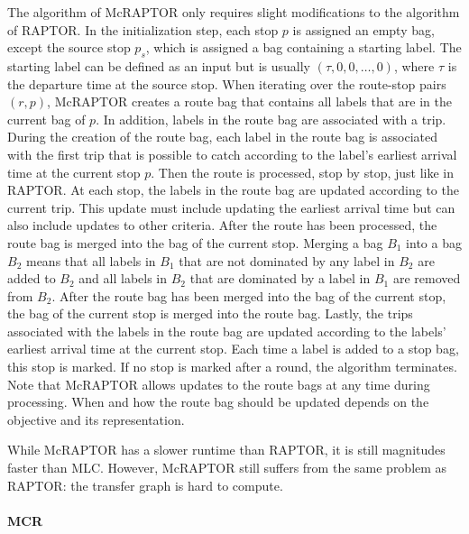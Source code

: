 The algorithm of McRAPTOR only requires slight modifications to the algorithm of RAPTOR.
In the initialization step, each stop \(p\) is assigned an empty bag, except the source stop \(p_s\), which is assigned a bag containing a starting label.
The starting label can be defined as an input but is usually \((\tau, 0, 0, \dots, 0)\), where \(\tau\) is the departure time at the source stop.
When iterating over the route-stop pairs \((r, p)\), McRAPTOR creates a route bag that contains all labels that are in the current bag of \(p\).
In addition, labels in the route bag are associated with a trip.
During the creation of the route bag, each label in the route bag is associated with the first trip that is possible to catch according to the label's earliest arrival time at the current stop \(p\).
Then the route is processed, stop by stop, just like in RAPTOR.
At each stop, the labels in the route bag are updated according to the current trip.
This update must include updating the earliest arrival time but can also include updates to other criteria.
After the route has been processed, the route bag is merged into the bag of the current stop.
Merging a bag \(B_1\) into a bag \(B_2\) means that all labels in \(B_1\) that are not dominated by any label in \(B_2\) are added to \(B_2\) and all labels in \(B_2\) that are dominated by a label in \(B_1\) are removed from \(B_2\).
After the route bag has been merged into the bag of the current stop, the bag of the current stop is merged into the route bag.
Lastly, the trips associated with the labels in the route bag are updated according to the labels' earliest arrival time at the current stop.
Each time a label is added to a stop bag, this stop is marked.
If no stop is marked after a round, the algorithm terminates.
Note that McRAPTOR allows updates to the route bags at any time during processing.
When and how the route bag should be updated depends on the objective and its representation.

While McRAPTOR has a slower runtime than RAPTOR, it is still magnitudes faster than MLC.
However, McRAPTOR still suffers from the same problem as RAPTOR: the transfer graph is hard to compute.


\paragraph{MCR}
\label{subsubsec:mcr}

